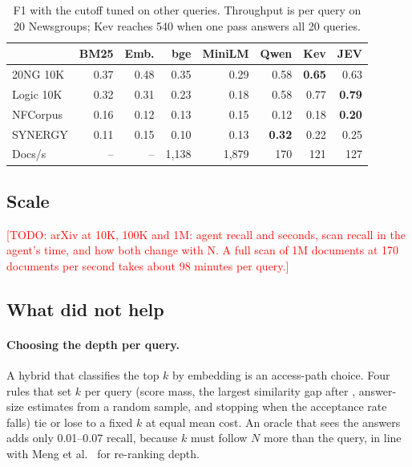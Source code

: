 \documentclass[sigconf,nonacm]{acmart}
\newcommand{\todo}[1]{\textcolor{red}{[TODO: #1]}}
\begin{document}
\begin{table}[t]
\centering
\small
\setlength{\tabcolsep}{3.2pt}
\begin{tabular}{@{}lrrrrrrr@{}}
\toprule
& BM25 & Emb. & bge & MiniLM & Qwen & Kev & JEV \\
\midrule
20NG 10K & 0.37 & 0.48 & 0.35 & 0.29 & 0.58 & \textbf{0.65} & 0.63 \\
Logic 10K & 0.32 & 0.31 & 0.23 & 0.18 & 0.58 & 0.77 & \textbf{0.79} \\
NFCorpus & 0.16 & 0.12 & 0.13 & 0.15 & 0.12 & 0.18 & \textbf{0.20} \\
SYNERGY & 0.11 & 0.15 & 0.10 & 0.13 & \textbf{0.32} & 0.22 & 0.25 \\
\midrule
Docs/s & -- & -- & 1,138 & 1,879 & 170 & 121 & 127 \\
\bottomrule
\end{tabular}
\caption{F1 with the cutoff tuned on other queries. Throughput is per query on
20 Newsgroups; Kev reaches 540 when one pass answers all 20 queries.}
\label{tab:scorers}
\end{table}

\subsection{Scale}

\todo{arXiv at 10K, 100K and 1M: agent recall and seconds, scan recall in the
agent's time, and how both change with N. A full scan of 1M documents at 170
documents per second takes about 98 minutes per query.}

\subsection{What did not help}

\paragraph{Choosing the depth per query.}
A hybrid that classifies the top $k$ by embedding is an access-path choice. Four
rules that set $k$ per query (score mass, the largest similarity gap after
\cite{taguchi2025adaptivek}, answer-size estimates from a random sample, and
stopping when the acceptance rate falls) tie or lose to a fixed $k$ at equal
mean cost. An oracle that sees the answers adds only 0.01--0.07 recall, because
$k$ must follow $N$ more than the query, in line with Meng et
al.~\cite{meng2024rlt} for re-ranking depth.
\end{document}
